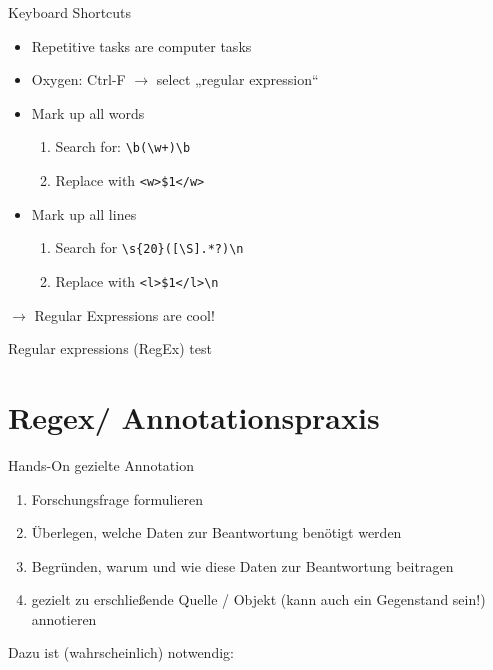 

\begin{frame}[fragile]{Keyboard Shortcuts}
    
\begin{itemize}
    \item Repetitive tasks are computer tasks
    \item Oxygen: Ctrl-F $\to$ select „regular expression“
    \item Mark up all words
    \begin{enumerate}
        \item Search for: \verb|\b(\w+)\b|
        \item Replace with \verb|<w>$1</w>|
    \end{enumerate}
    \item Mark up all lines
    \begin{enumerate}
        \item Search for \verb|\s{20}([\S].*?)\n|
        \item Replace with \verb|<l>$1</l>\n|
    \end{enumerate}
\end{itemize}
$\to$ Regular Expressions are cool!
\end{frame}


\begin{frame}{Regular expressions (RegEx)}
  test  
\end{frame}





\section{Regex/ Annotationspraxis}
\begin{frame}[allowframebreaks]{Hands-On gezielte Annotation}
\\ 
\smallskip 

 \footnotesize
\begin{enumerate}
    \item Forschungsfrage formulieren
    \item Überlegen, welche Daten zur Beantwortung benötigt werden
    \item Begründen, warum und wie diese Daten zur Beantwortung beitragen
    \item gezielt zu erschließende Quelle / Objekt (kann auch ein Gegenstand sein!) annotieren
\end{enumerate}

Dazu ist (wahrscheinlich)  notwendig:\\[0.5em]
\end{frame}

